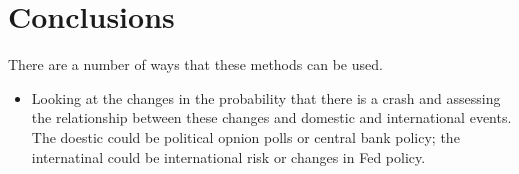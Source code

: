 \documentclass[12pt, a4paper, oneside]{article} %
\begin{document}
\section{Conclusions}
There are a number of ways that these methods can be used. 
\begin{itemize}
\item Looking at the changes in the probability that there is a crash and assessing the relationship between these changes and domestic and international events.  The doestic could be political opnion polls or central bank policy; the internatinal could be international risk or changes in Fed policy.  
\end{itemize}


\end{document}
